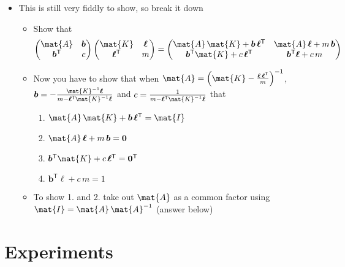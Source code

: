 \documentclass[11pt]{article}
\newcommand{\tr}{\textsf{T}}
\newcommand{\vl}{\bm{\ell}}
\newcommand{\vb}{\bm{b}}
\begin{document}
\begin{itemize}
\begin{itemize}
\item This is still very fiddly to show, so break it down
\begin{itemize}
\item Show that
$$ \begin{pmatrix} \mat{A} & \vb \\ \vb^\tr & c \end{pmatrix}
	 \begin{pmatrix} \mat{K} & \vl \\ \vl^\tr & m \end{pmatrix} =
	 \begin{pmatrix} \mat{A}\,\mat{K} + \vb\,\vl^\tr &
         \mat{A}\,\vl + m\,\vb \\ 
         \vb^\tr\mat{K} + c\,\vl^\tr & \vb^\tr \vl + c\,m \end{pmatrix} $$
\item Now you have to show that when \(\mat{A} = 
         \left(\mat{K}-\frac{\vl\,\vl^\tr}{m}\right)^{-1}\),
\(\vb=-\frac{\mat{K}^{-1} \vl}{m-\vl^\tr \mat{K}^{-1}\vl}\)
and \(c=\frac{1}{m-\vl^\tr \mat{K}^{-1}\vl}\) that
\begin{enumerate}
\item \(\mat{A}\,\mat{K} + \vb\,\vl^\tr = \mat{I}\)
\item \(\mat{A}\,\vl + m\,\vb = \bm{0}\)
\item \(\vb^\tr\mat{K} + c\,\vl^\tr = \bm{0}^\tr\)
\item \(\vb^\tr \vl + c\,m = 1\)
\end{enumerate}
\item To show 1. and 2. take out \(\mat{A}\) as a common factor using
\(\mat{I}=\mat{A}\,\mat{A}^{-1}\) (answer below)
\end{itemize}
\end{itemize}
\end{itemize}

\section{Experiments}
\label{sec:org42a446e}
\end{document}
